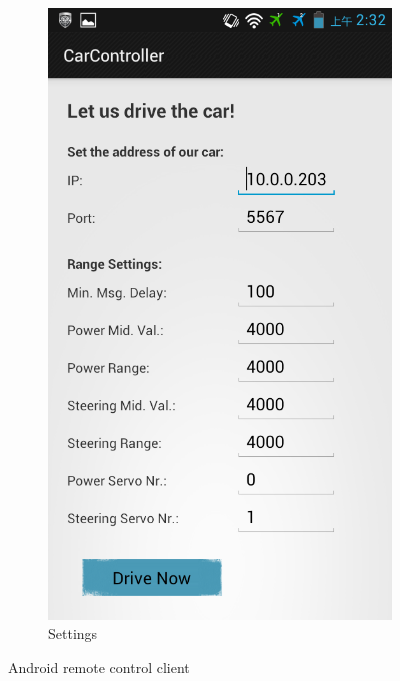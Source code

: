 \documentclass[a4paper
               ,10pt
               ,DIV=10 %
               ,BCOR=0.3cm
               ,pagesize %
               ,headings=small
               ,bibtotoc
               ]
               {scrartcl}
\begin{document}
\begin{figure}[H]
\begin{subfigure}[b]{0.3\textwidth}
    \includegraphics[width=\textwidth]{pic/figand2.png}
    \caption{Settings}
  \end{subfigure}
  \caption{Android remote control client}
  \label{figservoboardbrd}
\end{figure}
\end{document}
